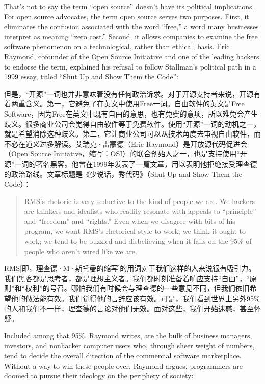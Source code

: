 \ifdefined\eng
That's not to say the term ``open source'' doesn't have its political implications. For open source advocates, the term open source serves two purposes. First, it eliminates the confusion associated with the word ``free,'' a word many businesses interpret as meaning ``zero cost.'' Second, it allows companies to examine the free software phenomenon on a technological, rather than ethical, basis. Eric Raymond, cofounder of the Open Source Initiative and one of the leading hackers to endorse the term, explained his refusal to follow Stallman's political path in a 1999 essay, titled ``Shut Up and Show Them the Code'':
\fi

\ifdefined\chs
但是，“开源”一词也并非意味着没有任何政治诉求。对于开源支持者来说，开源有着两重含义。第一，它避免了在英文中使用Free一词。自由软件的英文是Free Software，因为Free在英文中既有自由的意思，也有免费的意项，所以难免会产生歧义。很多商业公司会觉得自由软件等于免费软件。使用“开源”一词的动机之一，就是希望消除这种歧义。第二，它让商业公司可以从技术角度去审视自由软件，而不必在道义过多解读。艾瑞克·雷蒙德（Eric Raymond）是开放源代码促进会（Open Source Initiative，缩写：OSI）的联合创始人之一，也是支持使用“开源”一词的著名黑客。他曾在1999年发表了一篇文章，用以表明他拒绝接受理查德的政治路线。文章标题是《少说话，秀代码》（Shut Up and Show Them the Code）：
\fi

\ifdefined\eng
\begin{quote}
RMS's rhetoric is very seductive to the kind of people we are. We hackers are thinkers and idealists who readily resonate with appeals to ``principle'' and ``freedom'' and ``rights.'' Even when we disagree with bits of his program, we want RMS's rhetorical style to work; we think it ought to work; we tend to be puzzled and disbelieving when it fails on the 95\% of people who aren't wired like we are.
\end{quote}
\fi

\ifdefined\chs
RMS[即，理查德·M·斯托曼的缩写]的用词对于我们这样的人来说很有吸引力。我们黑客都是思考者，都是理想主义者。我们都时刻准备着响应支持“自由”，“原则”和“权利”的号召。哪怕我们有时候会与理查德的一些意见不同，但我们依旧希望他的做法能有效。我们觉得他的言辞应该有效。可是，我们看到世界上另外95\%的人和我们不一样，理查德的言论对他们无效。面对这些，我们开始迷惑，甚至怀疑。
\fi

\ifdefined\eng
Included among that 95\%, Raymond writes, are the bulk of business managers, investors, and nonhacker computer users who, through sheer weight of numbers, tend to decide the overall direction of the commercial software marketplace. Without a way to win these people over, Raymond argues, programmers are doomed to pursue their ideology on the periphery of society:
\fi


